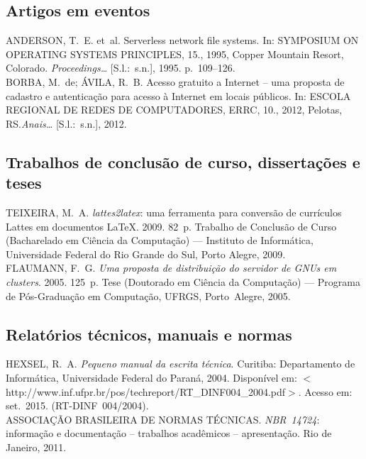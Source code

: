 \documentclass{ifsultcc}
\begin{document}
\subsection{Artigos em eventos}
\begin{flushleft}
	ANDERSON, T.~E. et~al. Serverless network file systems. In: SYMPOSIUM ON OPERATING SYSTEMS PRINCIPLES, 15., 1995, Copper Mountain Resort, Colorado. \emph{Proceedings{\ldots}} [S.l.:~s.n.], 1995. p.~109--126.\\[.5cm]

  	BORBA, M.~de; ÁVILA, R.~B\@. Acesso gratuito a Internet -- uma proposta de cadastro e autenticação para acesso à Internet em locais públicos. In: ESCOLA REGIONAL DE REDES DE COMPUTADORES, ERRC, 10., 2012, Pelotas, RS\@.\emph{Anais{\ldots}} [S.l.:~s.n.], 2012.
\end{flushleft}

\subsection{Trabalhos de conclusão de curso, dissertações e teses}
\begin{flushleft}
	TEIXEIRA, M.~A\@. \emph{lattes2latex}: uma ferramenta para conversão de currículos Lattes em documentos LaTeX\@. 2009. 82~p. Trabalho de Conclusão de Curso (Bacharelado em Ciência da Computação) --- Instituto de Informática, Universidade Federal do Rio Grande do Sul, Porto Alegre, 2009.\\[.5cm]
	
	FLAUMANN, F.~G\@. \emph{Uma proposta de distribuição do servidor de GNUs em clusters}. 2005. 125~p.  Tese (Doutorado em Ciência da Computação) --- Programa de Pós-Graduação em Computação, UFRGS, Porto~Alegre, 2005.
\end{flushleft}

\subsection{Relatórios técnicos, manuais e normas}
\begin{flushleft}
	HEXSEL, R.~A\@. \emph{Pequeno manual da escrita técnica}. Curitiba: Departamento de Informática, Universidade Federal do Paraná, 2004. Disponível em: $<$http://www.inf.ufpr.br/pos/techreport/RT\_DINF004\_2004.pdf$>$. Acesso em: set.~2015. (RT-DINF~004/2004).\\[.5cm]
	
	ASSOCIAÇÃO BRASILEIRA DE NORMAS TÉCNICAS. \emph{{NBR}~14724}: informação e documentação -- trabalhos acadêmicos -- apresentação. Rio de Janeiro, 2011.
\end{flushleft}
\end{document}
